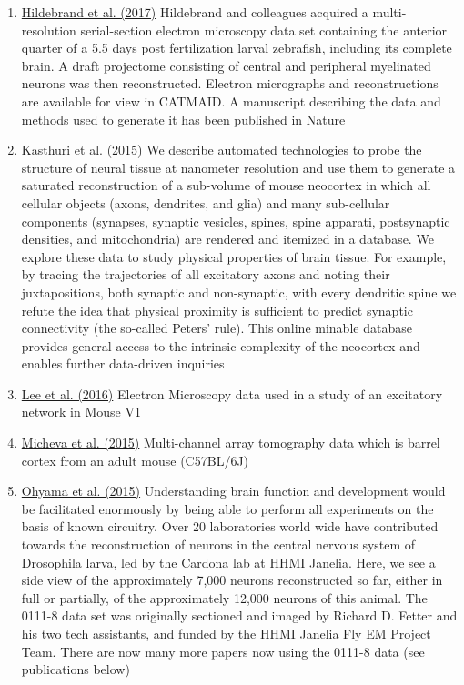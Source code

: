 \documentclass[10pt,colorlinks=true,urlcolor=blue]{moderncv}
\begin{document}
\begin{enumerate}
    \item \href{https://neurodata.io/data/hildebrand17}{Hildebrand et al. (2017)} 
        Hildebrand and colleagues acquired a multi-resolution serial-section electron microscopy data set containing the anterior quarter of a 5.5 days post fertilization larval zebrafish, including its complete brain.  A draft projectome consisting of central and peripheral myelinated neurons was then reconstructed.  Electron micrographs and reconstructions are available for view in CATMAID.  A manuscript describing the data and methods used to generate it has been published in Nature%

    \item \href{https://neurodata.io/data/kasthuri15}{Kasthuri et al. (2015)}
        We describe automated technologies to probe the structure of neural tissue at nanometer resolution and use them to generate a saturated reconstruction of a sub-volume of mouse neocortex in which all cellular objects (axons, dendrites, and glia) and many sub-cellular components (synapses, synaptic vesicles, spines, spine apparati, postsynaptic densities, and mitochondria) are rendered and itemized in a database. We explore these data to study physical properties of brain tissue. For example, by tracing the trajectories of all excitatory axons and noting their juxtapositions, both synaptic and non-synaptic, with every dendritic spine we refute the idea that physical proximity is sufficient to predict synaptic connectivity (the so-called Peters’ rule). This online minable database provides general access to the intrinsic complexity of the neocortex and enables further data-driven inquiries%

    \item \href{https://neurodata.io/data/lee16}{Lee et al. (2016)}
        Electron Microscopy data used in a study of an excitatory network in Mouse V1%

    \item \href{https://neurodata.io/data/kristina15}{Micheva et al. (2015)}
        Multi-channel array tomography data which is barrel cortex from an adult mouse (C57BL/6J)%

    \item \href{https://neurodata.io/data/acardona_0111_8}{Ohyama et al. (2015)} 
        Understanding brain function and development would be facilitated enormously by being able to perform all experiments on the basis of known circuitry. Over 20 laboratories world wide have contributed towards the reconstruction of neurons in the central nervous system of Drosophila larva, led by the Cardona lab at HHMI Janelia. Here, we see a side view of the approximately 7,000 neurons reconstructed so far, either in full or partially, of the approximately 12,000 neurons of this animal. The 0111-8 data set was originally sectioned and imaged by Richard D. Fetter and his two tech assistants, and funded by the HHMI Janelia Fly EM Project Team. There are now many more papers now using the 0111-8 data (see publications below)%


\end{enumerate}
\end{document}
